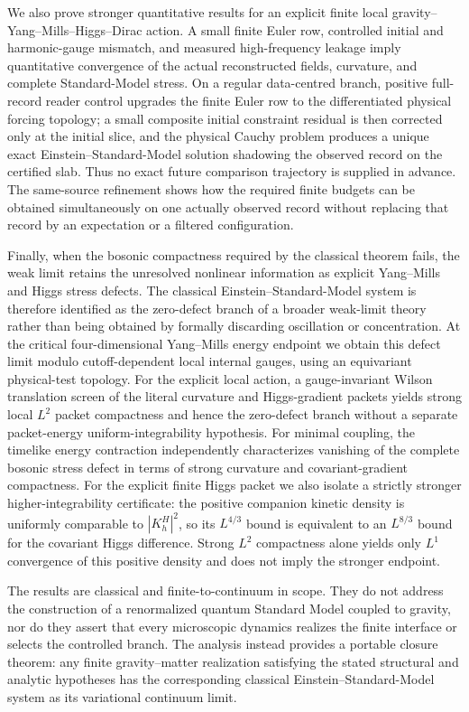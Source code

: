 \documentclass[11pt]{article}
\numberwithin{equation}{section}
\theoremstyle{definition}
\theoremstyle{remark}
\begin{document}
We also prove stronger quantitative results for an explicit finite local
gravity--Yang--Mills--Higgs--Dirac action.  A small finite Euler row,
controlled initial and harmonic-gauge mismatch, and measured high-frequency
leakage imply quantitative convergence of the actual reconstructed fields,
curvature, and complete Standard-Model stress.  On a regular data-centred
branch, positive full-record reader control upgrades the finite Euler row to
the differentiated physical forcing topology; a small composite initial
constraint residual is then corrected only at the initial slice, and the
physical Cauchy problem produces a unique exact Einstein--Standard-Model
solution shadowing the observed record on the certified slab.  Thus no exact
future comparison trajectory is supplied in advance.  The same-source
refinement shows how the required finite budgets can be obtained
simultaneously on one actually observed record without replacing that record
by an expectation or a filtered configuration.

Finally, when the bosonic compactness required by the classical theorem
fails, the weak limit retains the unresolved nonlinear information as
explicit Yang--Mills and Higgs stress defects.  The classical
Einstein--Standard-Model system is therefore identified as the zero-defect
branch of a broader weak-limit theory rather than being obtained by formally
discarding oscillation or concentration.  At the critical four-dimensional
Yang--Mills energy endpoint we obtain this defect limit modulo cutoff-dependent
local internal gauges, using an equivariant physical-test topology.  For the
explicit local action, a gauge-invariant Wilson translation screen of the
literal curvature and Higgs-gradient packets yields strong local $L^2$
packet compactness and hence the zero-defect branch without a separate
packet-energy uniform-integrability hypothesis.  For minimal coupling, the
timelike energy contraction independently characterizes vanishing of the
complete bosonic stress defect in terms of strong curvature and
covariant-gradient compactness.  For the explicit finite Higgs packet we also
isolate a strictly stronger higher-integrability certificate: the positive
companion kinetic density is uniformly comparable to $|K_h^H|^2$, so its
$L^{4/3}$ bound is equivalent to an $L^{8/3}$ bound for the covariant Higgs
difference.  Strong $L^2$ compactness alone yields only $L^1$ convergence of
this positive density and does not imply the stronger endpoint.

The results are classical and finite-to-continuum in scope.  They do not
address the construction of a renormalized quantum Standard Model coupled to
gravity, nor do they assert that every microscopic dynamics realizes the
finite interface or selects the controlled branch.  The analysis instead
provides a portable closure theorem: any finite gravity--matter realization
satisfying the stated structural and analytic hypotheses has the corresponding
classical Einstein--Standard-Model system as its variational continuum limit.
\end{document}

